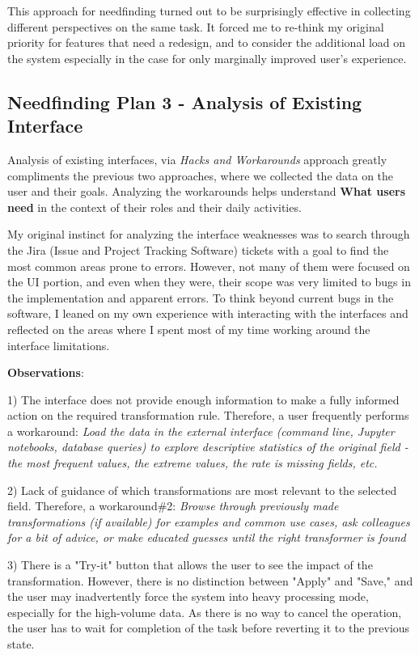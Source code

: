 \documentclass[12pt,letterpaper]{article}
\begin{document}
This approach for needfinding turned out to be surprisingly effective in collecting different perspectives on the same task. It forced me to re-think my original priority for features that need a redesign, and to consider the additional load on the system especially in the case for only marginally improved user's experience. 


\subsection*{Needfinding Plan 3 - Analysis of Existing Interface}
Analysis of existing interfaces, via \textit{Hacks and Workarounds} approach greatly compliments the previous two approaches, where we collected the data on the user and their goals. Analyzing the workarounds helps understand \textbf{What users need} in the context of their roles and their daily activities. 

My original instinct for analyzing the interface weaknesses was to search through the Jira (Issue and Project Tracking Software) tickets with a goal to find the most common areas prone to errors. However, not many of them were focused on the UI portion, and even when they were, their scope was very limited to bugs in the implementation and apparent errors. To think beyond current bugs in the software, I leaned on my own experience with interacting with the interfaces and reflected on the areas where I spent most of my time working around the interface limitations.  

\textbf{Observations}:

1) The interface does not provide enough information to make a fully informed action on the required transformation rule. Therefore, a user frequently performs a workaround: \textit{Load the data in the external interface (command line, Jupyter notebooks, database queries) to explore descriptive statistics of the original field - the most frequent values,  the extreme values, the rate is missing fields, etc.}

2) Lack of guidance of which transformations are most relevant to the selected field. Therefore, a workaround\#2: \textit{Browse through previously made transformations (if available) for examples and common use cases, ask colleagues for a bit of advice, or make educated guesses until the right transformer is found}

3) There is a "Try-it" button that allows the user to see the impact of the transformation. However, there is no distinction between "Apply" and "Save," and the user may inadvertently force the system into heavy processing mode, especially for the high-volume data.  As there is no way to cancel the operation, the user has to wait for completion of the task before reverting it to the previous state.
\end{document}
